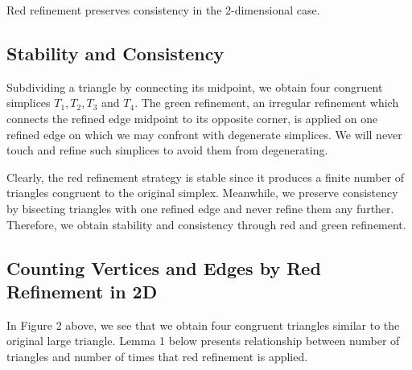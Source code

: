     \begin{lemma*}
    Red refinement preserves consistency in the 2-dimensional case.
    \end{lemma*}

    \subsection{Stability and Consistency}
    Subdividing a triangle by connecting its midpoint, we obtain four congruent simplices $T_1, T_2, T_3$ and $T_4$. The green refinement, an irregular refinement which connects the refined edge midpoint to its opposite corner, is applied on one refined edge on which we may confront with degenerate simplices. We will never touch and refine such simplices to avoid them from degenerating.

    Clearly, the red refinement strategy is stable since it produces a finite number of triangles congruent to the original simplex. Meanwhile, we preserve consistency by bisecting triangles with one refined edge and never refine them any further. Therefore, we obtain stability and consistency through red and green refinement.

    \subsection{Counting Vertices and Edges by Red Refinement in 2D}
    In Figure 2 above, we see that we obtain four congruent triangles similar to the original large triangle. Lemma 1 below presents relationship between number of triangles and number of times that red refinement is applied.

